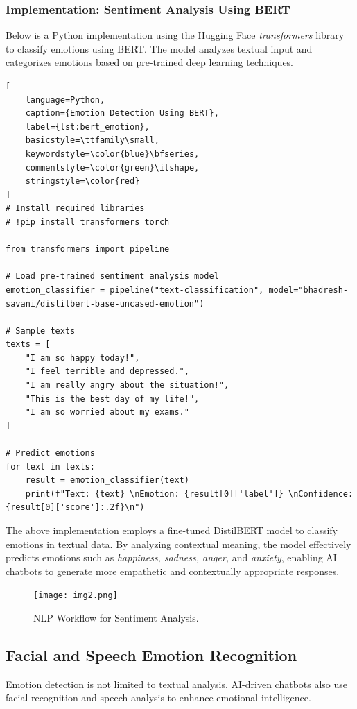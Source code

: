 \documentclass[a4paper,10pt]{article}
\begin{document}
\subsubsection{Implementation: Sentiment Analysis Using BERT}  

Below is a Python implementation using the Hugging Face \textit{transformers} library to classify emotions using BERT. The model analyzes textual input and categorizes emotions based on pre-trained deep learning techniques.  

\begin{lstlisting}[
    language=Python, 
    caption={Emotion Detection Using BERT}, 
    label={lst:bert_emotion}, 
    basicstyle=\ttfamily\small, 
    keywordstyle=\color{blue}\bfseries, 
    commentstyle=\color{green}\itshape, 
    stringstyle=\color{red}
]
# Install required libraries
# !pip install transformers torch

from transformers import pipeline

# Load pre-trained sentiment analysis model
emotion_classifier = pipeline("text-classification", model="bhadresh-savani/distilbert-base-uncased-emotion")

# Sample texts
texts = [
    "I am so happy today!",
    "I feel terrible and depressed.",
    "I am really angry about the situation!",
    "This is the best day of my life!",
    "I am so worried about my exams."
]

# Predict emotions
for text in texts:
    result = emotion_classifier(text)
    print(f"Text: {text} \nEmotion: {result[0]['label']} \nConfidence: {result[0]['score']:.2f}\n")
\end{lstlisting}

The above implementation employs a fine-tuned DistilBERT model to classify emotions in textual data. By analyzing contextual meaning, the model effectively predicts emotions such as \textit{happiness, sadness, anger,} and \textit{anxiety}, enabling AI chatbots to generate more empathetic and contextually appropriate responses.  

\begin{figure}[h]
    \centering
    \texttt{[image: img2.png]}
    \caption{NLP Workflow for Sentiment Analysis.}
    \label{fig:nlp_workflow}
\end{figure}


\newpage
\subsection{Facial and Speech Emotion Recognition}
Emotion detection is not limited to textual analysis. AI-driven chatbots also use facial recognition and speech analysis to enhance emotional intelligence.
\end{document}
